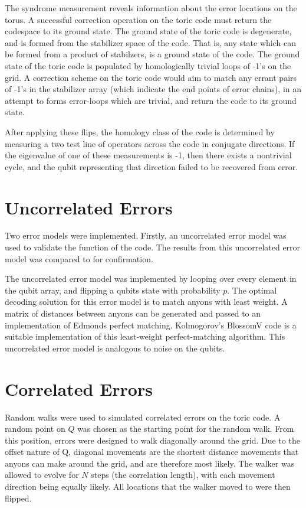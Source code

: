 	The syndrome measurement reveals information about the error locations on the torus. 
	A successful correction operation on the toric code must return the codespace to its ground state. The ground state of the toric code is degenerate, and is formed from the stabilizer space of the code. That is, any state which can be formed from a product of stabilzers, is a ground state of the code. The ground state of the toric code is populated by homologically trivial loops of -1's on the grid. A correction scheme on the toric code would aim to match any errant pairs of -1's in the stabilizer array (which indicate the end points of error chains), in an attempt to forms error-loops which are trivial, and return the code to its ground state.
	
	After applying these flips, the homology class of the code is determined by measuring a two test line of operators across the code in conjugate directions. If the eigenvalue of one of these measurements is -1, then there exists a nontrivial cycle, and the qubit representing that direction failed to be recovered from error. 
	\section{Uncorrelated Errors}
	Two error models were implemented. Firstly, an uncorrelated error model was used to validate the function of the code. The results from this uncorrelated error model was compared to \cite{Stace2010} for confirmation. 

	The uncorrelated error model was implemented by looping over every element in the qubit array, and flipping a qubits state with probability $p$. 
	The optimal decoding solution for this error model is to match anyons with least weight. A matrix of distances between anyons can be generated and passed to an implementation of Edmonds perfect matching. Kolmogorov's BlossomV code \cite{Kolmogorov2009} is a suitable implementation of this least-weight perfect-matching algorithm. This uncorrelated error model is analogous to noise on the qubits.

	\section{Correlated Errors}
	Random walks were used to simulated correlated errors on the toric code. 
	A random point on $Q$ was chosen as the starting point for the random walk. From this position, errors were designed to walk diagonally around the grid. Due to the offset nature of Q, diagonal movements are the shortest distance movements that anyons can make around the grid, and are therefore most likely. The walker was allowed to evolve for $N$ steps (the correlation length), with each movement direction being equally likely. 
	All locations that the walker moved to were then flipped.
	
